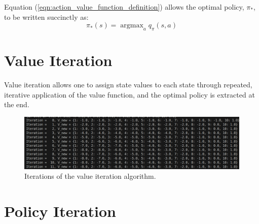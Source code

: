 \documentclass[a4paper,11pt]{article}
\DeclareMathOperator*{\argmax}{argmax}
\begin{document}
Equation (\ref{eqn:action_value_function_definition}) allows the optimal policy, $\pi_{*}$, to be written succinctly as:
\begin{equation} \label{eqn:optimal_policy_wrt_action_values}
    \pi_{*}(s) = \argmax_a q_{\pi}(s,a)
\end{equation}

\section{Value Iteration}

Value iteration allows one to assign state values to each state through repeated, iterative application of the value function, and the optimal policy is extracted at the end.  



\begin{figure}
    \includegraphics[width=\textwidth]{images/iters-of-value-iteration-1d-grid-world-code-output.png}
    \caption{Iterations of the value iteration algorithm.}
    \label{fig:iters-of-value-iteration-1d-grid-world-code-output}
\end{figure}


\section{Policy Iteration}
\end{document}
